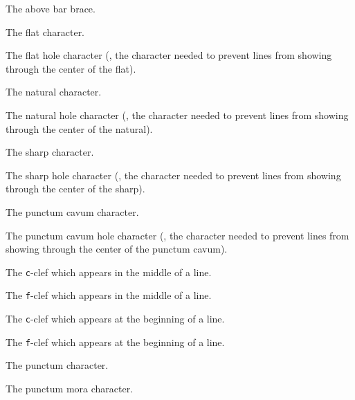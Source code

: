 The above bar brace.

The flat character.

The flat hole character (\ie, the character needed to prevent lines from showing through the center of the flat).

The natural character.

The natural hole character (\ie, the character needed to prevent lines from showing through the center of the natural).

The sharp character.

The sharp hole character (\ie, the character needed to prevent lines from showing through the center of the sharp).

The punctum cavum character.

The punctum cavum hole character (\ie, the character needed to prevent lines from showing through the center of the punctum cavum).

The \texttt{c}-clef which appears in the middle of a line.

The \texttt{f}-clef which appears in the middle of a line.

The \texttt{c}-clef which appears at the beginning of a line.

The \texttt{f}-clef which appears at the beginning of a line.

The punctum character.

The punctum mora character.

